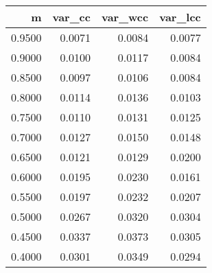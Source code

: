 \begin{table}[ht]
\centering
\begin{tabular}{rrrr}
  \hline
m & var\_cc & var\_wcc & var\_lcc \\ 
  \hline
0.9500 & 0.0071 & 0.0084 & 0.0077 \\ 
  0.9000 & 0.0100 & 0.0117 & 0.0084 \\ 
  0.8500 & 0.0097 & 0.0106 & 0.0084 \\ 
  0.8000 & 0.0114 & 0.0136 & 0.0103 \\ 
  0.7500 & 0.0110 & 0.0131 & 0.0125 \\ 
  0.7000 & 0.0127 & 0.0150 & 0.0148 \\ 
  0.6500 & 0.0121 & 0.0129 & 0.0200 \\ 
  0.6000 & 0.0195 & 0.0230 & 0.0161 \\ 
  0.5500 & 0.0197 & 0.0232 & 0.0207 \\ 
  0.5000 & 0.0267 & 0.0320 & 0.0304 \\ 
  0.4500 & 0.0337 & 0.0373 & 0.0305 \\ 
  0.4000 & 0.0301 & 0.0349 & 0.0294 \\ 
   \hline
\end{tabular}
\end{table}
